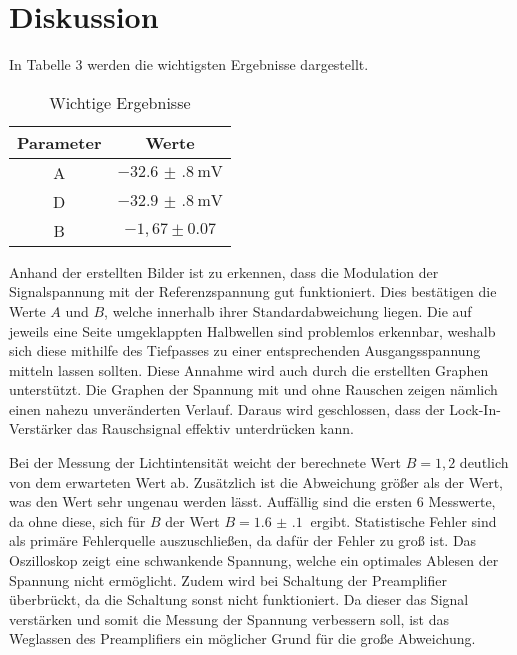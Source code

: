 \section{Diskussion}
\label{sec:Diskussion}

In Tabelle 3 werden die wichtigsten Ergebnisse dargestellt.
\begin{table}[H]
  \centering
  \caption{Wichtige Ergebnisse}
  \label{tab:Phase}
  \begin{tabular}{c c}
    \toprule
    Parameter & Werte \\
    \midrule
    A & $\SI{-32.6(8)}{\milli\volt}$ \\
    D & $\SI{-32.9(8)}{\milli\volt}$ \\
    B & $-1,67 \pm 0.07$ \\
    \bottomrule
  \end{tabular}
\end{table}



Anhand der erstellten Bilder ist zu erkennen, dass die Modulation der Signalspannung mit der Referenzspannung gut funktioniert. Dies bestätigen
die Werte $A$ und $B$, welche innerhalb ihrer Standardabweichung liegen.
Die auf jeweils eine Seite umgeklappten Halbwellen sind problemlos erkennbar, weshalb sich diese mithilfe des
Tiefpasses zu einer entsprechenden Ausgangsspannung mitteln lassen sollten. Diese Annahme wird auch durch die erstellten
Graphen unterstützt.
Die Graphen der Spannung mit und ohne Rauschen zeigen nämlich einen nahezu unveränderten Verlauf. Daraus wird geschlossen, dass der
Lock-In-Verstärker das Rauschsignal effektiv unterdrücken kann.

Bei der Messung der Lichtintensität weicht der berechnete Wert $B=1,2$ deutlich von dem erwarteten Wert ab. Zusätzlich ist die Abweichung
größer als der Wert, was den Wert sehr ungenau werden lässt.
Auffällig sind die ersten 6 Messwerte, da ohne diese, sich für $B$ der Wert $B= \SI{1.6(1)}{}$ ergibt. Statistische Fehler sind
als primäre Fehlerquelle auszuschließen, da dafür der Fehler zu groß ist. Das Oszilloskop zeigt eine schwankende Spannung, welche
ein optimales Ablesen der Spannung nicht ermöglicht. Zudem wird bei Schaltung der Preamplifier überbrückt, da die Schaltung sonst nicht
funktioniert. Da dieser das Signal verstärken und somit die Messung der Spannung verbessern soll, ist das Weglassen des
Preamplifiers ein möglicher Grund für die große Abweichung.
